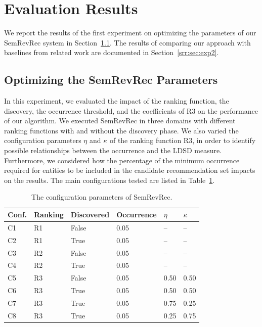 \section{Evaluation Results}
\label{srr:sec:res}

We report the results of the first experiment on optimizing the parameters of our SemRevRec system in Section~\ref{srr:sec:exp1}. The results of comparing our approach with baselines from related work are documented in Section~\ref{srr:sec:exp2}.

\subsection{Optimizing the SemRevRec Parameters}
\label{srr:sec:exp1}

In this experiment, we evaluated the impact of the ranking function, the discovery, the occurrence threshold, and the coefficients of R3 on the performance of our algorithm. We executed SemRevRec in three domains with different ranking functions with and without the discovery phase. We also varied the configuration parameters $\eta$ and $\kappa$ of the ranking function R3, in order to identify possible relationships between the occurrence and the LDSD measure. Furthermore, we considered how the percentage of the minimum occurrence required for entities to be included in the candidate recommendation set impacts on the results. The main configurations tested are listed in Table~\ref{srr:tab:config}.

\begin{table}
\centering
\begin{tabular}{@{}llllll@{}}
\toprule
Conf. & Ranking & Discovered & Occurrence & $\eta$ & $\kappa$ \\ \midrule
C1    & R1      & False      & 0.05       & --     & --       \\
C2    & R1      & True       & 0.05       & --     & --       \\
C3    & R2      & False      & 0.05       & --     & --       \\
C4    & R2      & True       & 0.05       & --     & --       \\
C5    & R3      & False      & 0.05       & 0.50   & 0.50     \\
C6    & R3      & True       & 0.05       & 0.50   & 0.50     \\
C7    & R3      & True       & 0.05       & 0.75   & 0.25     \\
C8    & R3      & True       & 0.05       & 0.25   & 0.75     \\
\bottomrule 
\end{tabular}
\caption[Configuration parameters of SemRevRec]{The configuration parameters of SemRevRec.}
\label{srr:tab:config}
\end{table}

